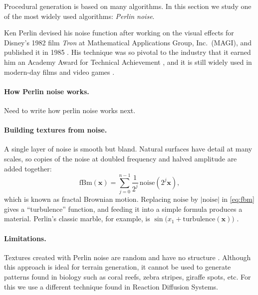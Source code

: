 \documentclass[a4paper, 11pt]{article}
\begin{document}
Procedural generation is based on many algorithms. In this section we study one of the most widely used algorithms: \emph{Perlin noise}.


Ken Perlin devised his noise function after working on the visual effects for Disney's 1982 film \emph{Tron} at Mathematical Applications Group, Inc.\ (MAGI), and published it in 1985 \parencite{perlin1985}. His technique was so pivotal to the industry that it earned him an Academy Award for Technical Achievement \parencite{nyuperlin}, and it is still widely used in modern-day films and video games \parencite{lagae2010}.

\paragraph{How Perlin noise works.}
Need to write how perlin noise works next.

\paragraph{Building textures from noise.}
A single layer of noise is smooth but bland. Natural surfaces have detail at many scales, so copies of the noise at doubled frequency and halved amplitude are added together:
\begin{equation}
	\label{eq:fbm}
	\mathrm{fBm}(\mathbf{x}) = \sum_{j=0}^{n-1} \frac{1}{2^j}\, \mathrm{noise}\!\left(2^j \mathbf{x}\right),
\end{equation}
which is known as fractal Brownian motion. Replacing $\mathrm{noise}$ by $\lvert \mathrm{noise} \rvert$ in \cref{eq:fbm} gives a ``turbulence'' function, and feeding it into a simple formula produces a material. Perlin's classic marble, for example, is $\sin\bigl(x_1 + \mathrm{turbulence}(\mathbf{x})\bigr)$ \parencite{perlin1985}.


\paragraph{Limitations.}

Textures created with Perlin noise are random and have no structure \parencite{lagae2010}. Although this approach is ideal for terrain generation, it cannot be used to generate patterns found in biology such as coral reefs, zebra stripes, giraffe spots, etc. For this we use a different technique found in Reaction Diffusion Systems.
\end{document}
